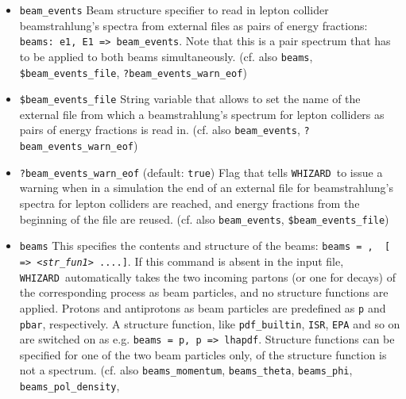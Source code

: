 \documentclass[12pt]{book}
\newcommand{\ttt}[1]{\texttt{#1}}
\newcommand{\whizard}{\texttt{WHIZARD}}
\begin{document}
\begin{itemize}
If \whizard's automatic detection of decay channels are switched on
($\to$ \ttt{?auto\_decays} for the ($\to$) \ttt{unstable} command,
this flags decides whether radiative decays (e.g. containing
additional photon(s)/gluon(s)) are taken into account or
not. \newline (cf. also \ttt{auto\_decays\_multiplicity},
\ttt{?decay\_rest\_frame}, \ttt{?isotropic\_decay}, \newline
\ttt{?diagonal\_decay})  
\item
\ttt{beam\_events} \newline
Beam structure specifier to read in lepton collider beamstrahlung's
spectra from external files as pairs of energy fractions: \ttt{beams:
  e1, E1 => beam\_events}. Note that this is a pair spectrum that has to
be applied to both beams simultaneously. (cf. also \ttt{beams}, 
\ttt{\$beam\_events\_file}, \ttt{?beam\_events\_warn\_eof})
\item
\ttt{\$beam\_events\_file} \newline 
String variable that allows to set the name of the external file from
which a beamstrahlung's spectrum for lepton colliders as pairs of
energy fractions is read in. (cf. also \ttt{beam\_events},
\ttt{?beam\_events\_warn\_eof})
\item
\ttt{?beam\_events\_warn\_eof} \qquad (default: \ttt{true}) \newline
Flag that tells \whizard\ to issue a warning when in a simulation the
end of an external file for beamstrahlung's spectra for lepton
colliders are reached, and energy fractions from the beginning of the
file are reused. (cf. also \ttt{beam\_events},
\ttt{\$beam\_events\_file}) 
\item
\ttt{beams} \newline
This specifies the contents and structure of the beams: \ttt{beams =
  {\em <prt1>}, {\em <prt2>} [ => {\em <str\_fun1>} ....]}. If this
command is absent in the input file, \whizard\ automatically takes the
two incoming partons (or one for decays) of the corresponding process
as beam particles, and no structure functions are applied. Protons and
antiprotons as beam particles are predefined as \ttt{p} and
\ttt{pbar}, respectively. A structure function, like \ttt{pdf\_builtin},
\ttt{ISR}, \ttt{EPA} and so on are switched on as e.g. \ttt{beams = p,
p => lhapdf}. Structure functions can be specified for one of the two
beam particles only, of the structure function is not a
spectrum. (cf. also \ttt{beams\_momentum}, \ttt{beams\_theta}, 
\ttt{beams\_phi}, \ttt{beams\_pol\_density},

\end{itemize}
\end{document}
